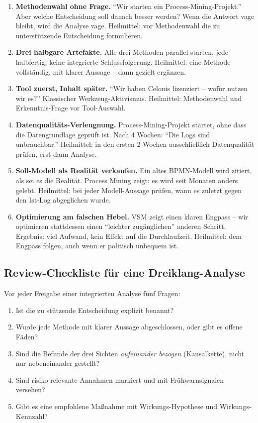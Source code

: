 \documentclass[11pt,a4paper,oneside]{article}
\newcommand{\fachbegriff}[1]{\textbf{#1}}
\begin{document}
\begin{enumerate}
  \item \fachbegriff{Methodenwahl ohne Frage.} ``Wir starten ein Process-Mining-Projekt.'' Aber welche Entscheidung soll danach besser werden? Wenn die Antwort vage bleibt, wird die Analyse vage. Heilmittel: vor Methodenwahl die zu unterstützende Entscheidung formulieren.
  \item \fachbegriff{Drei halbgare Artefakte.} Alle drei Methoden parallel starten, jede halbfertig, keine integrierte Schlussfolgerung. Heilmittel: eine Methode vollständig, mit klarer Aussage -- dann gezielt ergänzen.
  \item \fachbegriff{Tool zuerst, Inhalt später.} ``Wir haben Celonis lizenziert -- wofür nutzen wir es?'' Klassischer Werkzeug-Aktivismus. Heilmittel: Methodenwahl und Erkenntnis-Frage vor Tool-Auswahl.
  \item \fachbegriff{Datenqualitäts-Verleugnung.} Process-Mining-Projekt startet, ohne dass die Datengrundlage geprüft ist. Nach 4 Wochen: ``Die Logs sind unbrauchbar.'' Heilmittel: in den ersten 2 Wochen ausschließlich Datenqualität prüfen, erst dann Analyse.
  \item \fachbegriff{Soll-Modell als Realität verkaufen.} Ein altes BPMN-Modell wird zitiert, als sei es die Realität. Process Mining zeigt: es wird seit Monaten anders gelebt. Heilmittel: bei jeder Modell-Aussage prüfen, wann es zuletzt gegen den Ist-Log abgeglichen wurde.
  \item \fachbegriff{Optimierung am falschen Hebel.} VSM zeigt einen klaren Engpass -- wir optimieren stattdessen einen ``leichter zugänglichen'' anderen Schritt. Ergebnis: viel Aufwand, kein Effekt auf die Durchlaufzeit. Heilmittel: dem Engpass folgen, auch wenn er politisch unbequem ist.
\end{enumerate}

\subsection{Review-Checkliste für eine Dreiklang-Analyse}

Vor jeder Freigabe einer integrierten Analyse fünf Fragen:

\begin{enumerate}
  \item Ist die zu stützende Entscheidung explizit benannt?
  \item Wurde jede Methode mit klarer Aussage abgeschlossen, oder gibt es offene Fäden?
  \item Sind die Befunde der drei Sichten \emph{aufeinander bezogen} (Kausalkette), nicht nur nebeneinander gestellt?
  \item Sind risiko-relevante Annahmen markiert und mit Frühwarnsignalen versehen?
  \item Gibt es eine empfohlene Maßnahme mit Wirkungs-Hypothese und Wirkungs-Kennzahl?
\end{enumerate}
\end{document}
